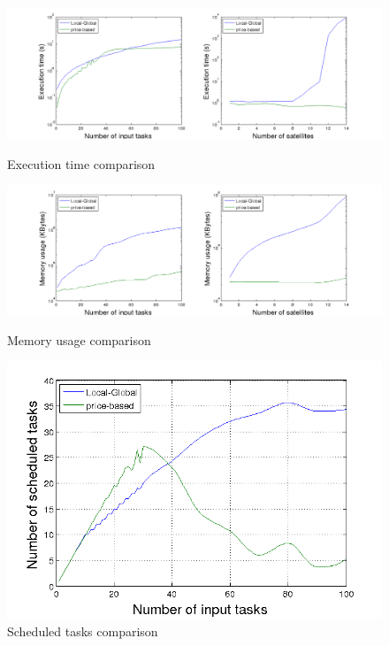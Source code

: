 \begin{figure}[ht]
  \begin{minipage}[b]{\linewidth}
    \includegraphics[width=\linewidth]{Figures/tLGMB.png}
    \caption{Execution time comparison}\label{fig_tLGMB}
  \end{minipage} 
  
  \begin{minipage}[b]{\linewidth}
    \includegraphics[width=\linewidth]{Figures/mLGMB.png} 
    \caption{Memory usage comparison}\label{fig_mLGMB}
  \end{minipage} 
  
  \begin{minipage}[b]{\linewidth}
  \centering
    \includegraphics[width=0.6\linewidth]{Figures/aLGMB.png}
    \caption{Scheduled tasks comparison}\label{fig_aLGMB}
  \centering
  \end{minipage}
  \hfill
\end{figure}